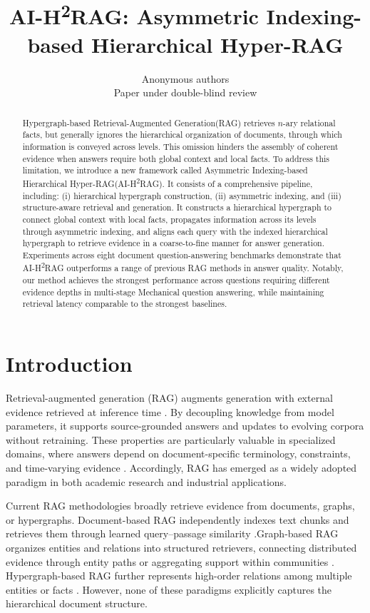 \documentclass{article} %
\title{AI-H\textsuperscript{2}RAG: Asymmetric Indexing-based Hierarchical Hyper-RAG}
\author{Anonymous authors\\
Paper under double-blind review}
\begin{document}
\maketitle

\begin{abstract}
Hypergraph-based Retrieval-Augmented Generation(RAG) retrieves $n$-ary relational facts, but generally ignores the hierarchical organization of documents, through which information is conveyed across levels. This omission hinders the assembly of coherent evidence when answers require both global context and local facts. To address this limitation, we introduce a new framework called Asymmetric Indexing-based Hierarchical Hyper-RAG(AI-H\textsuperscript{2}RAG). It consists of a comprehensive pipeline, including: (i) hierarchical hypergraph construction, (ii) asymmetric indexing, and (iii) structure-aware retrieval and generation. It constructs a hierarchical hypergraph to connect global context with local facts, propagates information across its levels through asymmetric indexing, and aligns each query with the indexed hierarchical hypergraph to retrieve evidence in a coarse-to-fine manner for answer generation. Experiments across eight document question-answering benchmarks demonstrate that AI-H\textsuperscript{2}RAG outperforms a range of previous
RAG methods in answer quality. Notably, our method achieves the strongest performance across questions requiring different evidence depths in multi-stage Mechanical question answering, while maintaining retrieval latency comparable to the strongest baselines.
\end{abstract}

\section{Introduction}
Retrieval-augmented generation (RAG) augments generation with external evidence retrieved at inference time \citep{Lewis2020RAG,Guu2020REALM}. By decoupling knowledge from model parameters, it supports source-grounded answers and updates to evolving corpora without retraining. These properties are particularly valuable in specialized domains, where answers depend on document-specific terminology, constraints, and time-varying evidence \citep{Yang2025KBSLLMKB}. Accordingly, RAG has emerged as a widely adopted paradigm in both academic research and industrial applications.

Current RAG methodologies broadly retrieve evidence from documents, graphs, or hypergraphs. Document-based RAG independently indexes text chunks and retrieves them through learned query--passage similarity \citep{Izacard2023Atlas}.Graph-based RAG organizes entities and relations into structured retrievers, connecting distributed evidence through entity paths or aggregating support within communities \citep{Jin2024LLMGraphs,Zhong2023KGConstruction}. Hypergraph-based RAG further represents high-order relations among multiple entities or facts \citep{Feng2019HGNN,Feng2026HyperRAG}. However, none of these paradigms explicitly captures the hierarchical document structure.
\end{document}

